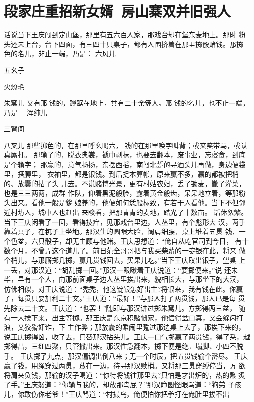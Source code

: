 \chapter{段家庄重招新女婿~房山寨双并旧强人}

话说当下王庆闯到定山堡，那里有五六百人家，那戏台却在堡东麦地上。那时
粉头还未上台，台下四面，有三四十只桌子，都有人围挤着在那里掷骰赌钱。那掷
色的名儿，非止一端，乃是：
六风儿

五幺子

火燎毛

朱窝儿
又有那钱的，蹲踞在地上，共有二十余簇人。那钱的名儿，也不止一端，乃是：
浑纯儿

三背间

八叉儿
那些掷色的，在那里呼幺喝六，钱的在那里唤字叫背；或夹笑带骂，或认真厮打。
那输了的，脱衣典裳，褫巾剥袜，也要去翻本，废事业，忘寝食，到底是个输字；
那赢的，意气扬扬，东摆西摇，南闯北踅的寻酒头儿再做，身边便袋里，搭膊里，
衣袖里，都是银钱。到后捉本算帐，原来赢不多，赢的都被把梢的、放囊的拈了头
儿去。不说赌博光景，更有村姑农妇，丢了锄麦，撇了灌菜，也是三三两两，成群
作队，仰着黑泥般脸，露着黄金般齿，呆呆地立着，等那粉头出来。看他一般是爹
娘养的，他便如何恁般标致，有若干人看他。当下不但邻近村坊人，城中人也赶出
来睃看，把那青青的麦地，踏光了十数亩。
话休絮繁。当下王庆闲看了一回，看得技痒，见那戏台里边，人丛里，有个彪形大
汉，两手靠着桌子，在杌子上坐地。那汉生的圆眼大脸，阔肩细腰，桌上堆着五贯
钱，一个色盆，六只骰子，却无主顾与他赌。王庆思想道：“俺自从吃官司到今日，
有十数个月，不曾弄这个道儿了。前日范全哥哥把与我买柴薪的一锭银在此，将来
做个梢儿，与那厮掷几掷，赢几贯钱回去，买果儿吃。”当下王庆取出银子，望桌
上一丢，对那汉道：“胡乱掷一回。”那汉一眼瞅着王庆说道：“要掷便来。”说
还未毕，早有一个人，向那前面桌子边人丛里挨出来，貌相长大，与那坐下的大汉，
仿佛相似，对王庆说道：“秃秃，他这锭银怎好出主?将银来，我有钱在此。你赢
了，每贯只要加利二十文。”王庆道：“最好！”与那人打了两贯钱，那人已是每
贯先除去二十文。王庆道：“也罢！”随即与那汉讲过掷朱窝儿。方掷得两三盆，
随有一人挨下来，出主等掷。那王庆是东京积赌惯家，他信得盆口真，又会躲闪打
浪，又狡猾奸诈，下主作弊；那放囊的乘闹里踅过那边桌上去了，那挨下来的，
说王庆掷得凶，收了去，只替那汉拈头儿。王庆一口气掷赢了两贯钱，得了采，越
掷得出，三红四聚，只管撒出来。那汉性急翻本，掷下便是绝，塌脚、小四不脱手。
王庆掷了九点，那汉偏调出倒八来；无一个时辰，把五贯钱输个罄尽。
王庆赢了钱，用绳穿过两贯，放在一边，待寻那汉赎梢。又将那三贯穿缚停当，方
欲将肩来负钱，那输的汉子喝道：“你待将钱往那里去?只怕是才出炉的，热的熬
炙了手。”王庆怒道：“你输与我的，却放那鸟屁？”那汉睁圆怪眼骂道：“狗弟
子孩儿，你敢伤你老爷！”王庆骂道：“村撮鸟，俺便怕你把拳打在俺肚里拔不出
